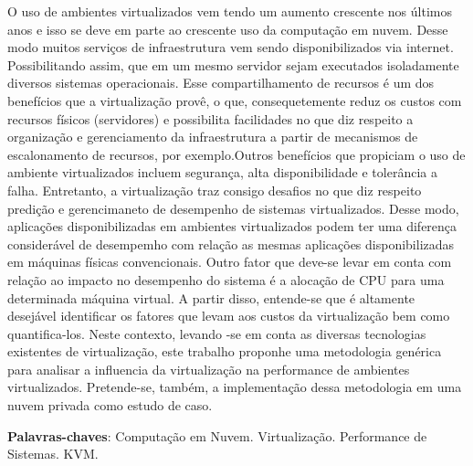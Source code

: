 \begin{resumo}
 O uso de ambientes virtualizados vem tendo um aumento crescente nos últimos anos e isso
se deve em parte ao crescente uso da computação em nuvem. Desse modo muitos serviços de infraestrutura vem sendo disponibilizados via internet. Possibilitando assim, que em um mesmo servidor sejam executados isoladamente diversos sistemas operacionais. Esse compartilhamento de recursos é um dos benefícios que a virtualização provê, o que, consequetemente reduz os custos com recursos físicos (servidores) e possibilita facilidades no que diz respeito a organização e gerenciamento da infraestrutura a partir de mecanismos de escalonamento de recursos, por exemplo.Outros benefícios que propiciam o uso de ambiente virtualizados incluem segurança, alta disponibilidade e tolerância a falha. Entretanto, a virtualização traz consigo desafios no que diz respeito predição e gerencimaneto de desempenho de sistemas virtualizados. Desse modo, aplicações disponibilizadas em ambientes virtualizados podem ter uma diferença considerável de desempemho com relação as mesmas aplicações disponibilizadas em máquinas físicas convencionais. Outro fator que deve-se levar em conta com relação ao impacto no desempenho do sistema é a alocação de CPU para uma determinada máquina virtual. A partir disso, entende-se que é altamente desejável identificar os fatores que levam aos custos da virtualização bem como quantifica-los. Neste contexto, levando -se em conta as diversas tecnologias existentes de virtualização, este trabalho proponhe uma metodologia genérica para analisar a influencia da virtualização na performance de ambientes virtualizados. Pretende-se, também, a implementação dessa metodologia em uma nuvem privada como estudo de caso.

 \vspace{\onelineskip}
    
 \noindent
 \textbf{Palavras-chaves}: Computação em Nuvem. Virtualização. Performance de Sistemas. KVM.
\end{resumo}
